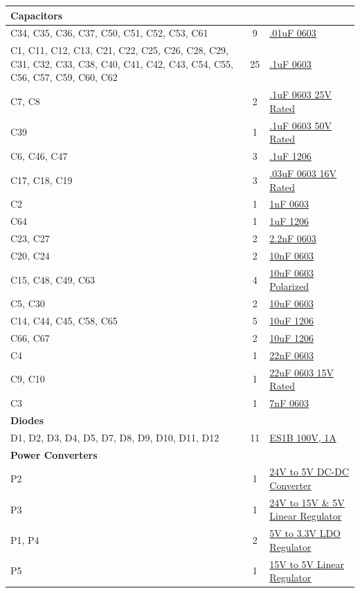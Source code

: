 \documentclass{article}
\begin{document}
\begin{longtable}{| >{\centering\arraybackslash}p{} | c | l |}
 {\textbf{Capacitors}}  \\ \hline
C34, C35, C36, C37, C50, C51, C52, C53, C61 & 9 & \href{}{.01uF 0603} \\ \hline
C1, C11, C12, C13, C21, C22, C25, C26, C28, C29, C31, C32, C33, C38, C40, C41, C42, C43, C54, C55, C56, C57, C59, C60, C62 & 25 & \href{}{.1uF 0603} \\ \hline
C7, C8 & 2 & \href{}{.1uF 0603 25V Rated} \\ \hline
C39 & 1 & \href{}{.1uF 0603 50V Rated} \\ \hline
C6, C46, C47 & 3 & \href{}{.1uF 1206} \\ \hline
C17, C18, C19 & 3 & \href{}{.03uF 0603 16V Rated} \\ \hline
C2 & 1 & \href{}{1nF 0603} \\ \hline
C64 & 1 & \href{}{1uF 1206} \\ \hline
C23, C27 & 2 & \href{}{2.2nF 0603} \\ \hline
C20, C24 & 2 & \href{}{10nF 0603} \\ \hline
C15, C48, C49, C63 & 4 & \href{}{10uF 0603 Polarized} \\ \hline
C5, C30 & 2 & \href{}{10uF 0603} \\ \hline
C14, C44, C45, C58, C65 & 5 & \href{}{10uF 1206} \\ \hline
C66, C67 & 2 & \href{}{10uF 1206} \\ \hline
C4 & 1 & \href{}{22nF 0603} \\ \hline
C9, C10 & 1 & \href{}{22uF 0603 15V Rated} \\ \hline
C3& 1 & \href{}{7nF 0603} \\ \hline

 {\textbf{Diodes}}  \\ \hline
D1, D2, D3, D4, D5, D7, D8, D9, D10, D11, D12 & 11 & \href{http://www.digikey.com/product-detail/en/ES1B/ES1BFSCT-ND/3042546}{ES1B 100V, 1A}\\ \hline

 {\textbf{Power Converters}}  \\ \hline
P2 & 1 & \href{http://www.digikey.com/product-search/en?WT.z_header=search_go&lang=en&site=us&keywords=CC10-2405SF-E&x=0&y=0&formaction=on}{24V to 5V DC-DC Converter}\\ \hline
P3 & 1 & \href{http://www.digikey.com/product-search/en?vendor=0&keywords=IFX21004TNV51}{24V to 15V \& 5V Linear Regulator}\\ \hline
P1, P4 & 2 & \href{http://www.digikey.com/product-detail/en/TLV1117LV33DCYR/296-28778-1-ND/2666520}{5V to 3.3V LDO Regulator}\\ \hline
P5 & 1 & \href{http://www.digikey.com/product-detail/en/LM2937IMPX-5.0\%2FNOPB/LM2937IMPX-5.0\%2FNOPBCT-ND/3526931}{15V to 5V Linear Regulator}\\ \hline


\end{longtable}
\end{document}
